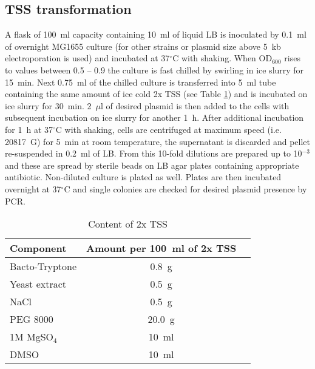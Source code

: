 \subsection{TSS transformation}
A flask of 100~ml capacity containing 10~ml of liquid LB is inoculated by 0.1~ml of overnight MG1655 culture (for other strains or plasmid size above 5~kb electroporation is used) and incubated at 37$^{\circ}$C with shaking.
When OD$_{600}$ rises to values between 0.5 -- 0.9 the culture is fast chilled by swirling in ice slurry for 15~min.
Next 0.75~ml of the chilled culture is transferred into 5~ml tube containing the same amount of ice cold 2x TSS (see Table \ref{tss}) and is incubated on ice slurry for 30~min.
2~$\mu$l of desired plasmid is then added to the cells with subsequent incubation on ice slurry for another 1~h.
After additional incubation for 1~h at 37$^{\circ}$C with shaking, cells are centrifuged at maximum speed (i.e. 20817~G) for 5~min at room temperature, the supernatant is discarded and pellet re-suspended in 0.2~ml of LB.
From this 10-fold dilutions are prepared up to 10$^{-3}$ and these are spread by sterile beads on LB agar plates containing appropriate antibiotic.
Non-diluted culture is plated as well.
Plates are then incubated overnight at 37$^{\circ}$C and single colonies are checked for desired plasmid presence by PCR.


\begin{center}
	\begin{longtable}[c]{|l|c|c|}
\caption{Content of 2x TSS} \label{tss} \\

\toprule \multicolumn{1}{|l|}{\textbf{Component}} & \multicolumn{1}{c|}{\textbf{Amount per 100~ml of 2x TSS}} \\
\midrule
\endhead

\bottomrule
\endlastfoot

Bacto-Tryptone & 0.8~g \\
\hline
Yeast extract & 0.5~g \\
\hline
NaCl & 0.5~g \\
\hline
PEG 8000 & 20.0~g \\
\hline
1M MgSO$_{4}$ & 10~ml \\
\hline
DMSO & 10~ml \\
	\end{longtable}
\end{center}

